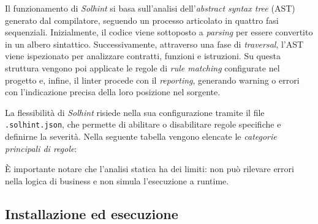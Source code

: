Il funzionamento di \textit{Solhint} si basa sull'analisi dell'\textit{abstract syntax tree} (AST) generato dal compilatore, seguendo un processo articolato in quattro fasi sequenziali. Inizialmente, il codice viene sottoposto a \textit{parsing} per essere convertito in un albero sintattico. Successivamente, attraverso una fase di \textit{traversal}, l'AST viene ispezionato per analizzare contratti, funzioni e istruzioni. Su questa struttura vengono poi applicate le regole di \textit{rule matching} configurate nel progetto e, infine, il linter procede con il \textit{reporting}, generando warning o errori con l'indicazione precisa della loro posizione nel sorgente.

La flessibilità di \textit{Solhint} risiede nella sua configurazione tramite il file \texttt{.solhint.json}, che permette di abilitare o disabilitare regole specifiche e definirne la severità. Nella seguente tabella vengono elencate le \textit{categorie principali di regole}:

\begin{table}[H]
\centering
{}
\end{table}

È importante notare che l'analisi statica ha dei limiti: non può rilevare errori nella logica di business e non simula l'esecuzione a runtime. 

\subsection{Installazione ed esecuzione}

